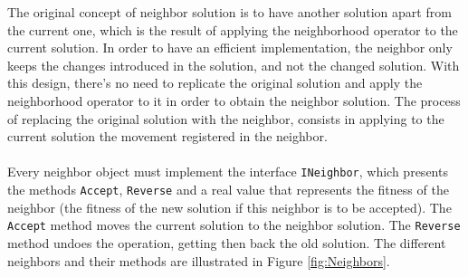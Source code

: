 The original concept of neighbor solution is to have another solution apart from the current one, which is the result of applying the neighborhood operator to the current solution. In order to have an efficient implementation, the neighbor only keeps the changes introduced in the solution, and not the changed solution. With this design, there's no need to replicate the original solution and apply the neighborhood operator to it in order to obtain the neighbor solution. The process of replacing the original solution with the neighbor, consists in applying to the current solution the movement registered in the neighbor.\\
\\
Every neighbor object must implement the interface \verb+INeighbor+, which presents the methods \verb+Accept+, \verb+Reverse+ and a real value that represents the fitness of the neighbor (the fitness of the new solution if this neighbor is to be accepted). The \verb+Accept+ method  moves the current solution to the neighbor solution. The \verb+Reverse+ method undoes the operation, getting then back the old solution. The different neighbors and their methods are illustrated in Figure \ref{fig:Neighbors}.\\
